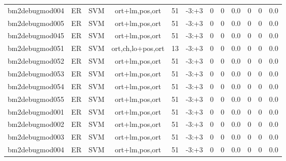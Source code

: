\documentclass[a4paper]{article}
\begin{document}
\begin{landscape}
\begin{center}
\begin{tabular}{ |c|c|c|c|c|c|c|c|c|c|c|c|}
 
 	
 	\small{ bm2debugmod004 } & ER & SVM & ort+lm,pos,ort  &  51 &  -3:+3  &  0 & 0 & 0.0  &  0 & 0 & 0.0 \\
 	

 
 	
 	\small{ bm2debugmod005 } & ER & SVM & ort+lm,pos,ort  &  51 &  -3:+3  &  0 & 0 & 0.0  &  0 & 0 & 0.0 \\
 	

 
 	
 	\small{ bm2debugmod045 } & ER & SVM & ort+lm,pos,ort  &  51 &  -3:+3  &  0 & 0 & 0.0  &  0 & 0 & 0.0 \\
 	

 
 	
 	\small{ bm2debugmod051 } & ER & SVM & ort,ch,lo+pos,ort  &  13 &  -3:+3  &  0 & 0 & 0.0  &  0 & 0 & 0.0 \\
 	

 
 	
 	\small{ bm2debugmod052 } & ER & SVM & ort+lm,pos,ort  &  51 &  -3:+3  &  0 & 0 & 0.0  &  0 & 0 & 0.0 \\
 	

 
 	
 	\small{ bm2debugmod053 } & ER & SVM & ort+lm,pos,ort  &  51 &  -3:+3  &  0 & 0 & 0.0  &  0 & 0 & 0.0 \\
 	

 
 	
 	\small{ bm2debugmod054 } & ER & SVM & ort+lm,pos,ort  &  51 &  -3:+3  &  0 & 0 & 0.0  &  0 & 0 & 0.0 \\
 	

 
 	
 	\small{ bm2debugmod055 } & ER & SVM & ort+lm,pos,ort  &  51 &  -3:+3  &  0 & 0 & 0.0  &  0 & 0 & 0.0 \\
 	

 
 	
 	\small{ bm2debugmod001 } & ER & SVM & ort+lm,pos,ort  &  51 &  -3:+3  &  0 & 0 & 0.0  &  0 & 0 & 0.0 \\
 	

 
 	
 	\small{ bm2debugmod002 } & ER & SVM & ort+lm,pos,ort  &  51 &  -3:+3  &  0 & 0 & 0.0  &  0 & 0 & 0.0 \\
 	

 
 	
 	\small{ bm2debugmod003 } & ER & SVM & ort+lm,pos,ort  &  51 &  -3:+3  &  0 & 0 & 0.0  &  0 & 0 & 0.0 \\
 	

 
 	
 	\small{ bm2debugmod004 } & ER & SVM & ort+lm,pos,ort  &  51 &  -3:+3  &  0 & 0 & 0.0  &  0 & 0 & 0.0 \\
 	


\end{tabular}
\end{center}
\end{landscape}
\end{document}
